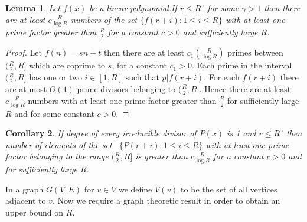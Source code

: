 \documentclass{amsart}
\newtheorem{Lemma 1}{Lemma}[section]
\newtheorem{Lemma 3}[Lemma 1]{Lemma}
\newtheorem{Lucas The}[Lemma 1]{Theorem}
\newtheorem{lemme}[Lemma 1]{Lemma}
\newtheorem{lem 1}[Lemma 1]{Lemma}
\newtheorem{Corollary 1}[Lemma 1]{Corollary}
\newtheorem{Corollary 2}[Lemma 1]{Corollary}
\begin{document}
	\begin{lemme}\label{Lemma 6}Let $f(x)$ be a linear polynomial.If $r\leq R^\gamma$ for some $\gamma>1$ then there are at least $c\frac{R}{\log R}$ numbers of the set $\{f(r+i): 1\leq i \leq R \}$ with at least one prime factor greater than $\frac{R}{2}$ for a constant $c>0$ and sufficiently large $R$. \end{lemme}\begin{proof}Let $f(n)=sn+t$ then there are at least $c_1(\frac{R}{\log R})$ primes between $(\frac{R}{2},R]$ which are coprime to $s$, for a constant $c_1>0$. Each prime in the interval $(\frac{R}{2},R]$ has one or two $i\in [1,R]$ such that $p|f(r+i)$. For each $f(r+i)$ there are at most $O(1)$ prime divisors belonging to $(\frac{R}{2},R]$. Hence there are at least $c\frac{R}{\log R}$ numbers with at least one prime factor greater than $\frac{R}{2}$ for sufficiently large $R$ and for some constant $c>0$.\end{proof}
	\begin{Corollary 2}\label{Corollary 3}If degree of every irreducible divisor of $P(x)$ is 1 and $r\leq R^\gamma$ then number of elements of the set  $\{P(r+i): 1\leq i \leq R\}$ with at least one prime factor belonging to the range $(\frac{R}{2},R]$ is greater than $c\frac{R}{\log R}$ for a constant $c>0$ and for sufficiently large $R$.\end{Corollary 2}
	In a graph $G(V,E)$ for $v\in V$ we define $V(v)$ to be the set of all vertices adjacent to $v$. Now we require a graph theoretic result in order to obtain an upper bound on $R$.
\end{document}
